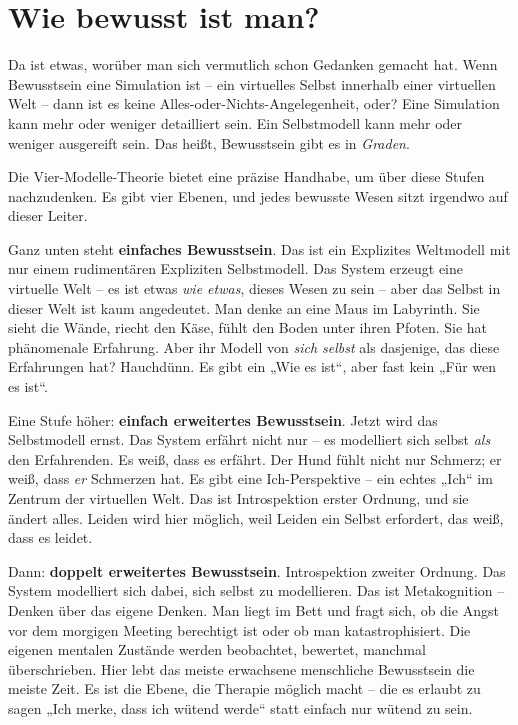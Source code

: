 \documentclass[11pt, twoside, openright]{book}
\begin{document}
\section*{Wie bewusst ist man?}

Da ist etwas, worüber man sich vermutlich schon Gedanken gemacht hat. Wenn Bewusstsein eine Simulation ist -- ein virtuelles Selbst innerhalb einer virtuellen Welt -- dann ist es keine Alles-oder-Nichts-Angelegenheit, oder? Eine Simulation kann mehr oder weniger detailliert sein. Ein Selbstmodell kann mehr oder weniger ausgereift sein. Das heißt, Bewusstsein gibt es in \textit{Graden}.

Die Vier-Modelle-Theorie bietet eine präzise Handhabe, um über diese Stufen nachzudenken. Es gibt vier Ebenen, und jedes bewusste Wesen sitzt irgendwo auf dieser Leiter.

Ganz unten steht \textbf{einfaches Bewusstsein}. Das ist ein Explizites Weltmodell mit nur einem rudimentären Expliziten Selbstmodell. Das System erzeugt eine virtuelle Welt -- es ist etwas \textit{wie etwas}, dieses Wesen zu sein -- aber das Selbst in dieser Welt ist kaum angedeutet. Man denke an eine Maus im Labyrinth. Sie sieht die Wände, riecht den Käse, fühlt den Boden unter ihren Pfoten. Sie hat phänomenale Erfahrung. Aber ihr Modell von \textit{sich selbst} als dasjenige, das diese Erfahrungen hat? Hauchdünn. Es gibt ein „Wie es ist“, aber fast kein „Für wen es ist“.

Eine Stufe höher: \textbf{einfach erweitertes Bewusstsein}. Jetzt wird das Selbstmodell ernst. Das System erfährt nicht nur -- es modelliert sich selbst \textit{als} den Erfahrenden. Es weiß, dass es erfährt. Der Hund fühlt nicht nur Schmerz; er weiß, dass \textit{er} Schmerzen hat. Es gibt eine Ich-Perspektive -- ein echtes „Ich“ im Zentrum der virtuellen Welt. Das ist Introspektion erster Ordnung, und sie ändert alles. Leiden wird hier möglich, weil Leiden ein Selbst erfordert, das weiß, dass es leidet.

Dann: \textbf{doppelt erweitertes Bewusstsein}. Introspektion zweiter Ordnung. Das System modelliert sich dabei, sich selbst zu modellieren. Das ist Metakognition -- Denken über das eigene Denken. Man liegt im Bett und fragt sich, ob die Angst vor dem morgigen Meeting berechtigt ist oder ob man katastrophisiert. Die eigenen mentalen Zustände werden beobachtet, bewertet, manchmal überschrieben. Hier lebt das meiste erwachsene menschliche Bewusstsein die meiste Zeit. Es ist die Ebene, die Therapie möglich macht -- die es erlaubt zu sagen „Ich merke, dass ich wütend werde“ statt einfach nur wütend zu sein.
\end{document}
